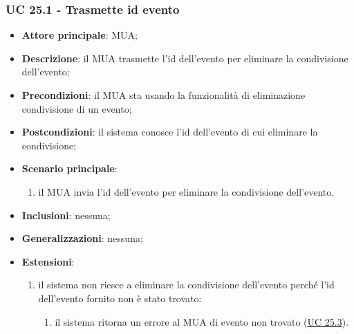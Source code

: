     \subsubsection{UC 25.1 - Trasmette id evento} \label{sec:UC25.1}
    \begin{itemize}
        \item \textbf{Attore principale}: MUA;
        \item \textbf{Descrizione}: il MUA trasmette l'id dell'evento per eliminare la condivisione dell'evento;
        \item \textbf{Precondizioni}: il MUA sta usando la funzionalità di eliminazione condivisione di un evento;
        \item \textbf{Postcondizioni}: il sistema conosce l'id dell'evento di cui eliminare la condivisione;
        \item \textbf{Scenario principale}:
            \begin{enumerate}
                \item il MUA invia l'id dell'evento per eliminare la condivisione dell'evento.
            \end{enumerate}
        \item \textbf{Inclusioni}: nessuna;
        \item \textbf{Generalizzazioni}: nessuna;
        \item \textbf{Estensioni}:
            \begin{enumerate}[label=\alph*.]
                \item il sistema non riesce a eliminare la condivisione dell'evento perché l'id dell'evento fornito non è stato trovato:
                \begin{enumerate}[label=\arabic*.]
                    \item il sistema ritorna un errore al MUA di evento non trovato (\hyperref[sec:UC25.3]{UC 25.3}).
                \end{enumerate}
            \end{enumerate}
    \end{itemize}


